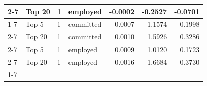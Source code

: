 \begin{tabular}{llllrrr}
\cline{2-7} \cline{3-7}
 & Top 20 & 1 & employed & -0.0002 & -0.2527 & -0.0701 \\
\cline{1-7} \cline{2-7} \cline{3-7}
\multirow[t]{4}{*}{full} & Top 5 & 1 & committed & 0.0007 & 1.1574 & 0.1998 \\
\cline{2-7} \cline{3-7}
 & Top 20 & 1 & committed & 0.0010 & 1.5926 & 0.3286 \\
\cline{2-7} \cline{3-7}
 & Top 5 & 1 & employed & 0.0009 & 1.0120 & 0.1723 \\
\cline{2-7} \cline{3-7}
 & Top 20 & 1 & employed & 0.0016 & 1.6684 & 0.3730 \\
\cline{1-7} \cline{2-7} \cline{3-7}
\bottomrule
\end{tabular}
